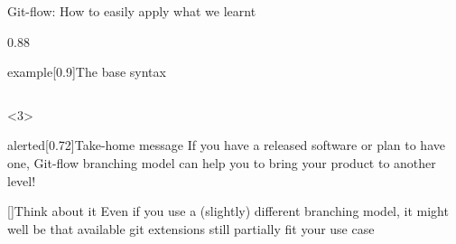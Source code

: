 \begin{frame}[fragile,c]{Git-flow: How to easily apply what we learnt}
\begin{overlayarea}{\textwidth}{0.88\textheight}
\begin{onlyenv}
\begin{varblock}{example}[0.9\textwidth]{The base syntax}
\begin{tabular}{r@{\;}l}
                \end{tabular}
            \end{varblock}
        \end{onlyenv}
        \begin{onlyenv}<3>
            \begin{varblock}{alerted}[0.72\textwidth]{Take-home message}
                If you have a released software or plan to have one, Git-flow branching model can help you to bring your product to another level!
            \end{varblock}
            \begin{varblock}{}[\textwidth]{Think about it}
                Even if you use a (slightly) different branching model, it might well be that available git extensions still partially fit your use case
            \end{varblock}
        \end{onlyenv}
    \end{overlayarea}
\end{frame}
